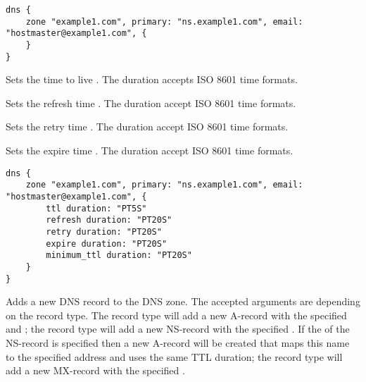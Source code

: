 \begin{lstlisting}[style=Java]
dns {
    zone "example1.com", primary: "ns.example1.com", email: "hostmaster@example1.com", {
    }
}
\end{lstlisting}


Sets the time to live . 
The duration accepts ISO 8601 time formats.


Sets the refresh time .
The duration accept ISO 8601 time formats.


Sets the retry time .
The duration accept ISO 8601 time formats.


Sets the expire time .
The duration accept ISO 8601 time formats.

\begin{lstlisting}[style=Java]
dns {
    zone "example1.com", primary: "ns.example1.com", email: "hostmaster@example1.com", {
        ttl duration: "PT5S"
        refresh duration: "PT20S"
        retry duration: "PT20S"
        expire duration: "PT20S"
        minimum_ttl duration: "PT20S"
    }
}
\end{lstlisting}


Adds a new DNS record to the DNS zone. 
The accepted arguments are depending on
the record type. The  record type will add a new A-record with the 
specified  and ; 
the  record type will add a 
new NS-record with the specified . If 
the  of the NS-record is specified then a new A-record will be 
created that maps this name to the specified address and uses the 
same TTL duration;
the  record type will add a 
new MX-record with the specified . 

